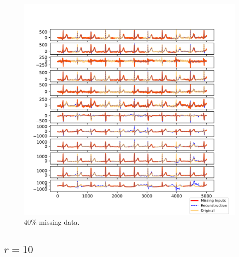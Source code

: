 \documentclass{mldsmsc}
\begin{document}
\begin{figure}[H]
\vspace{1em} %

\begin{minipage}{0.3\linewidth}
    \centering
    \includegraphics[width=\linewidth]{images/missing/psmf_output_40_3.pdf}
    \caption{$40\%$ missing data.}
\end{minipage}
\end{figure}

\subsection{$r = 10$}
\end{document}
